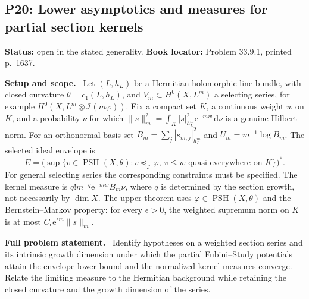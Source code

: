 \documentclass[11pt]{article}
\newcommand{\PSH}{\operatorname{PSH}}
\newcommand{\field}[1]{\par\medskip\noindent\textbf{#1.}\ }
\begin{document}
\subsection{P20: Lower asymptotics and measures for partial section kernels}
\label{P20}
\noindent\textbf{Status:} open in the stated generality. \textbf{Book locator:} Problem 33.9.1, printed p.~1637.
\field{Setup and scope} Let $(L,h_L)$ be a Hermitian holomorphic line bundle, with closed curvature $\theta=c_1(L,h_L)$, and $V_m\subset H^0(X,L^m)$ a selecting series, for example $H^0(X,L^m\otimes\mathcal I(m\varphi))$. Fix a compact set $K$, a continuous weight $w$ on $K$, and a probability $\nu$ for which
$\|s\|_m^2=\int_K|s|_{h_L^m}^2\mathrm e^{-mw}\,\mathrm d\nu$
is a genuine Hilbert norm. For an orthonormal basis set $B_m=\sum_j|s_{m,j}|_{h_L^m}^2$ and $U_m=m^{-1}\log B_m$. The selected ideal envelope is
\[E=\bigl(\sup\{v\in\PSH(X,\theta):v\preceq_{\mathcal I}\varphi,\ v\leq w\text{ quasi-everywhere on }K\}\bigr)^*.\]
For general selecting series the corresponding constraints must be specified. The kernel measure is $q!m^{-q}\mathrm e^{-mw}B_m\nu$, where $q$ is determined by the section growth, not necessarily by $\dim X$. The upper theorem uses $\varphi\in\PSH(X,\theta)$ and the Bernstein--Markov property: for every $\epsilon>0$, the weighted supremum norm on $K$ is at most $C_\epsilon\mathrm e^{\epsilon m}\|s\|_m$.
\field{Full problem statement} Identify hypotheses on a weighted section series and its intrinsic growth dimension under which the partial Fubini--Study potentials attain the envelope lower bound and the normalized kernel measures converge. Relate the limiting measure to the Hermitian background while retaining the closed curvature and the growth dimension of the series.
\end{document}
